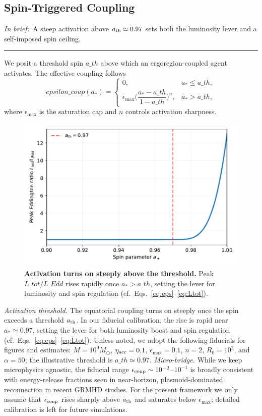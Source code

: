 \documentclass[twocolumn]{aastex701}
\newcommand{\ath}{a_{\rm th}}
\newcommand{\rg}{r_g}
\newcommand{\LEdd}{L_{\rm Edd}}
\newcommand{\Ltot}{L_{\rm tot}}
\newcommand{\FeKa}{\mathrm{Fe\,K}\alpha}
\newcommand{\epscoup}{\epsilon_{\rm coup}}
\newcommand{\aeq}{a_{\rm eq}}
\DeclareRobustCommand{\tldr}[1]{%
  \noindent\textit{In brief:}~#1%
  \par\smallskip
  \noindent\rule{\columnwidth}{0.2pt}\par\medskip
}
\def\ath{a\_th}\def\rg{r\_g}\def\LEdd{L\_Edd}\def\Ltot{L\_tot}\def\FeKa{Fe K\string\alpha}%
\def\epscoup{epsilon\_coup}\def\aeq{a\_eq}\def\mathrm#1{#1}%
\begin{document}
\subsection{Spin-Triggered Coupling}\label{sec:coupling}
\tldr{A steep activation above $a_{\rm th}\simeq0.97$ sets both the luminosity lever and a self-imposed spin ceiling.}
We posit a threshold spin $\ath$ above which an ergoregion-coupled agent activates. The effective coupling follows
\begin{equation}
\epscoup(a_\ast)=
\begin{cases}
0, & a_\ast\le \ath,\\[3pt]
\epsilon_{\max}\Big(\dfrac{a_\ast-\ath}{1-\ath}\Big)^{n}, & a_\ast>\ath,
\end{cases}
\label{eq:eps}
\end{equation}
where $\epsilon_{\max}$ is the saturation cap and $n$ controls activation sharpness.
\begin{figure}[!htbp]
  \centering
  \includegraphics[width=.92\linewidth]{Fig_Onset.pdf}
\caption{\textbf{Activation turns on steeply above the threshold.}
Peak $\Ltot/\LEdd$ rises rapidly once $a_\ast\!>\!\ath$, setting the lever for luminosity and spin regulation (cf.\ Eqs.~\eqref{eq:eps}--\eqref{eq:Ltot}).}
  \label{fig:onset}
\end{figure}
\noindent\textit{Activation threshold.}
The equatorial coupling turns on steeply once the spin exceeds a threshold \(a_{\rm th}\).
In our fiducial calibration, the rise is rapid near \(a_\ast \simeq 0.97\), setting the lever for both luminosity boost and spin regulation (cf.\ Eqs.~\eqref{eq:eps}--\eqref{eq:Ltot}).
\FloatBarrier
Unless noted, we adopt the following fiducials for figures and estimates: $M=10^9M_\odot$, $\eta_{\rm acc}=0.1$, $\epsilon_{\max}=0.1$, $n=2$, $R_0=10^2$, and $\alpha=50$; the illustrative threshold is $\ath\simeq0.97$.
\noindent\emph{Micro-bridge.}
While we keep microphysics agnostic, the fiducial range
$\epsilon_{\rm coup}\sim10^{-2}$--$10^{-1}$ is broadly consistent with
energy-release fractions seen in near-horizon, plasmoid-dominated
reconnection in recent GRMHD studies. For the present framework we only
assume that $\epsilon_{\rm coup}$ rises sharply above $a_{\rm th}$ and
saturates below $\epsilon_{\max}$; detailed calibration is left for
future simulations.
\end{document}

